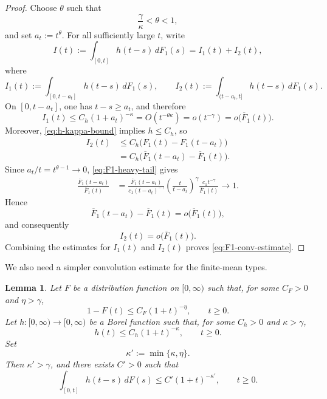 \documentclass[reqno,final,11pt]{amsart}
\theoremstyle{plain}
\newtheorem{lemma}[theorem]{Lemma}
\theoremstyle{definition}
\theoremstyle{remark}
\numberwithin{equation}{section}
\begin{document}
\begin{proof}
Choose \(\theta\) such that
\[
  \frac{\gamma}{\kappa}<\theta<1,
\]
and set \(a_t:=t^\theta\). For all sufficiently large \(t\), write
\[
  I(t):=\int_{[0,t]}h(t-s)\,dF_1(s)=I_1(t)+I_2(t),
\]
where
\[
  I_1(t):=\int_{[0,t-a_t]}h(t-s)\,dF_1(s),
  \qquad
  I_2(t):=\int_{(t-a_t,t]}h(t-s)\,dF_1(s).
\]
On \([0,t-a_t]\), one has \(t-s\ge a_t\), and therefore
\[
  I_1(t)
  \le C_h(1+a_t)^{-\kappa}
  =O(t^{-\theta\kappa})
  =o(t^{-\gamma})
  =o\bigl(\overline F_1(t)\bigr).
\]
Moreover, \eqref{eq:h-kappa-bound} implies \(h\le C_h\), so
\[
\begin{split}
  I_2(t)
  &\le C_h\bigl(F_1(t)-F_1(t-a_t)\bigr)\\
  &=C_h\bigl(\overline F_1(t-a_t)-\overline F_1(t)\bigr).
\end{split}
\]
Since \(a_t/t=t^{\theta-1}\to0\), \eqref{eq:F1-heavy-tail} gives
\[
\begin{split}
  \frac{\overline F_1(t-a_t)}{\overline F_1(t)}
  &=
  \frac{\overline F_1(t-a_t)}{c_1(t-a_t)^{-\gamma}}
  \left(\frac{t}{t-a_t}\right)^\gamma
  \frac{c_1t^{-\gamma}}{\overline F_1(t)}
  \longrightarrow1.
\end{split}
\]
Hence
\[
  \overline F_1(t-a_t)-\overline F_1(t)
  =o\bigl(\overline F_1(t)\bigr),
\]
and consequently
\[
  I_2(t)=o\bigl(\overline F_1(t)\bigr).
\]
Combining the estimates for \(I_1(t)\) and \(I_2(t)\) proves \eqref{eq:F1-conv-estimate}.
\end{proof}


We also need a simpler convolution estimate for the finite-mean types.


\begin{lemma}\label{lem:finite-tail-stieltjes}
Let \(F\) be a distribution function on \([0,\infty)\) such that, for some \(C_F>0\) and \(\eta>\gamma\),
\[
  1-F(t)\le C_F(1+t)^{-\eta},
  \qquad t\ge0.
\]
Let \(h:[0,\infty)\to[0,\infty)\) be a Borel function such that, for some \(C_h>0\) and \(\kappa>\gamma\),
\[
  h(t)\le C_h(1+t)^{-\kappa},
  \qquad t\ge0.
\]
Set
\[
  \kappa':=\min\{\kappa,\eta\}.
\]
Then \(\kappa'>\gamma\), and there exists \(C'>0\) such that
\begin{equation}\label{eq:finite-tail-conv}
  \int_{[0,t]}h(t-s)\,dF(s)
  \le C'(1+t)^{-\kappa'},
  \qquad t\ge0.
\end{equation}
\end{lemma}
\end{document}

